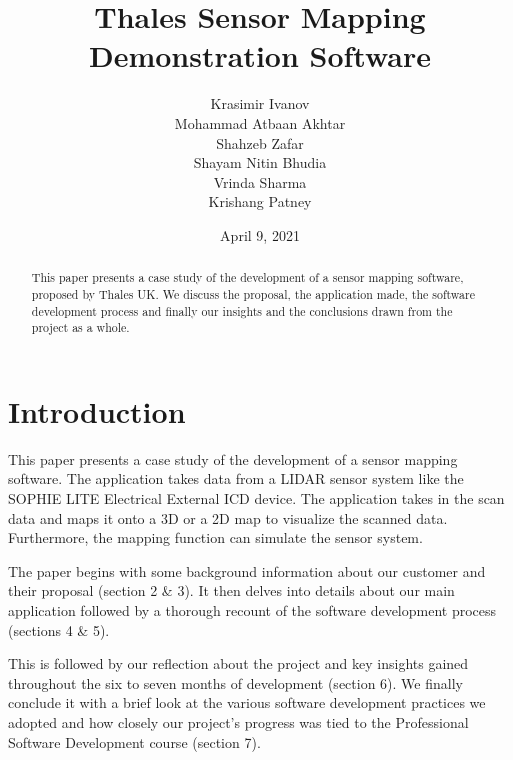 \documentclass{l3proj}
\begin{document}
\title{Thales Sensor Mapping Demonstration Software}

    \author{Krasimir Ivanov\\
        Mohammad Atbaan Akhtar \\
        Shahzeb Zafar \\
        Shayam Nitin Bhudia \\
        Vrinda Sharma\\ 
        Krishang Patney\\}

\date{April 9, 2021}

\maketitle

\begin{abstract}

This paper presents a case study of the development of a sensor mapping software, proposed by Thales UK. We discuss the proposal, the application made, the software development process and finally our insights and the conclusions drawn from the project as a whole.

\end{abstract}

\educationalconsent

\newpage

\section{Introduction}

This paper presents a case study of the development of a sensor mapping software. The application takes data from a LIDAR\cite{lidar} sensor system like the SOPHIE LITE Electrical External ICD device\cite{sophie}. The application takes in the scan data and maps it onto a 3D or a 2D map to visualize the scanned data. Furthermore, the mapping function can simulate the sensor system.

The paper begins with some background information about our customer and their proposal (section 2 \& 3). It then delves into details about our main application followed by a thorough recount of the software development process (sections 4 \& 5). 

This is followed by our reflection about the project and key insights gained throughout the six to seven months of development (section 6). We finally conclude it with a brief look at the various software development practices we adopted and how closely our project’s progress was tied to the Professional Software Development course (section 7).
\end{document}
